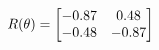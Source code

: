 \documentclass[preview]{standalone}
\begin{document}
\begin{align*}
\special{dvisvgm:raw <g id='unique000'>}R(\theta) = \begin{bmatrix}-0.87 & 0.48\\-0.48 & -0.87\end{bmatrix}\special{dvisvgm:raw </g>}
\end{align*}
\end{document}
